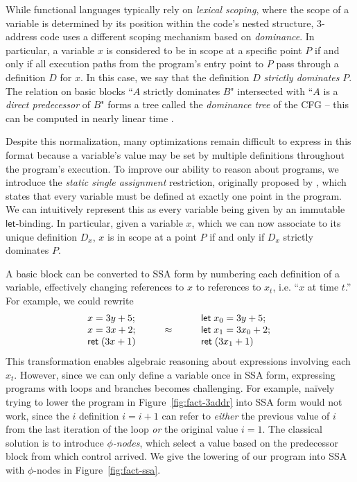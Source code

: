 \documentclass[acmsmall,screen,review]{acmart}
\newcommand{\ms}[1]{\ensuremath{\mathsf{#1}}}
\newcommand{\letexpr}[3]{\ensuremath{\ms{let}\;#1 = #2;\;#3}}
\begin{document}
While functional languages typically rely on \emph{lexical scoping}, where the scope of a variable
is determined by its position within the code's nested structure, 3-address code uses a different
scoping mechanism based on \emph{dominance}. In particular, a variable $x$ is considered to be in
scope at a specific point $P$ if and only if all execution paths from the program's entry point to
$P$ pass through a definition $D$ for $x$. In this case, we say that the definition $D$
\emph{strictly dominates} $P$. The relation on basic blocks ``$A$ strictly dominates $B$"
intersected with ``$A$ is a \emph{direct predecessor} of $B$" forms a tree called the
\emph{dominance tree} of the CFG -- this can be computed in nearly linear time
\cite{cytron-ssa-intro-91}.

Despite this normalization, many optimizations remain difficult to express in this format because a
variable's value may be set by multiple definitions throughout the program's execution. To improve
our ability to reason about programs, we introduce the \emph{static single assignment} restriction,
originally proposed by \citet{alpern-ssa-original-88}, which states that every variable must be
defined at exactly one point in the program. We can intuitively represent this as every variable
being given by an immutable \ms{let}-binding. In particular, given a variable $x$, which we can now
associate to its unique definition $D_x$, $x$ is in scope at a point $P$ if and only if $D_x$
strictly dominates $P$.

A basic block can be converted to SSA form by numbering each definition of a variable,
effectively changing references to $x$ to references to $x_t$, i.e. ``$x$ at time $t$.'' For
example, we could rewrite
\begin{equation*}
\begin{array}{lcl}
  x = 3y + 5; & & \letexpr{x_0}{3y + 5}{}  \\
  x = 3x + 2; & \qquad \approx \qquad & \letexpr{x_1}{3x_0 + 2} \\
  \ms{ret}\;(3x + 1) & & \ms{ret}\;(3x_1 + 1)
\end{array}
\end{equation*}
This transformation enables algebraic reasoning about expressions involving each $x_t$. However,
since we can only define a variable once in SSA form, expressing programs with loops and branches
becomes challenging. For example, na\"ively trying to lower the program in
Figure~\ref{fig:fact-3addr} into SSA form would not work, since the $i$ definition $i = i + 1$ can
refer to \emph{either} the previous value of $i$ from the last iteration of the loop \emph{or} the
original value $i = 1$. The classical solution is to introduce \emph{$\phi$-nodes}, which select a
value based on the predecessor block from which control arrived. We give the lowering of our program
into SSA with $\phi$-nodes in Figure~\ref{fig:fact-ssa}. 
\end{document}
